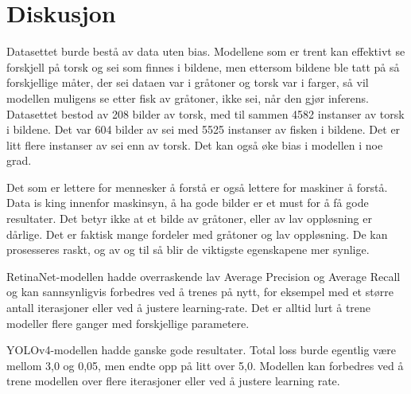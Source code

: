 




\section{Diskusjon}
\label{part:discussion}
Datasettet burde bestå av data uten bias. Modellene som er trent kan effektivt se forskjell på torsk og sei som finnes i bildene, men ettersom bildene ble tatt på så forskjellige måter, der sei dataen var i gråtoner og torsk var i farger, så vil modellen muligens se etter fisk av gråtoner, ikke sei, når den gjør inferens. Datasettet bestod av 208 bilder av torsk, med til sammen 4582 instanser av torsk i bildene. Det var 604 bilder av sei med 5525 instanser av fisken i bildene. Det er litt flere instanser av sei enn av torsk. Det kan også øke bias i modellen i noe grad.

Det som er lettere for mennesker å forstå er også lettere for maskiner å forstå. Data is king innenfor maskinsyn, å ha gode bilder er et must for å få gode resultater. Det betyr ikke at et bilde av gråtoner, eller av lav oppløsning er dårlige. Det er faktisk mange fordeler med gråtoner og lav oppløsning. De kan prosesseres raskt, og av og til så blir de viktigste egenskapene mer synlige.

RetinaNet-modellen hadde overraskende lav Average Precision og Average Recall og kan sannsynligvis forbedres ved å trenes på nytt, for eksempel med et større antall iterasjoner eller ved å justere learning-rate. Det er alltid lurt å trene modeller flere ganger med forskjellige parametere.

YOLOv4-modellen hadde ganske gode resultater. Total loss burde egentlig være mellom 3,0 og 0,05, men endte opp på litt over 5,0. Modellen kan forbedres ved å trene modellen over flere iterasjoner eller ved å justere learning rate.

